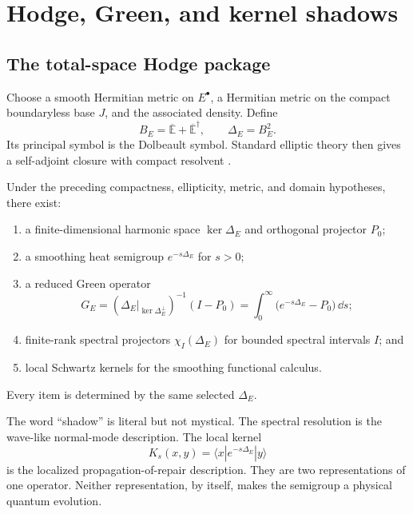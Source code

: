 \documentclass[11pt,a4paper]{article}
\newcommand{\Ebar}{\overline{\mathbb E}}
\begin{document}
\section{Hodge, Green, and kernel shadows}
\label{sec:hodge}

\subsection{The total-space Hodge package}

Choose a smooth Hermitian metric on \(E^\bullet\), a Hermitian metric on the
compact boundaryless base \(J\), and the associated density.  Define
\begin{equation}
B_E=\Ebar+\Ebar^{\dagger},
\qquad
\Delta_E=B_E^2.
\label{eq:super-hodge}
\end{equation}
Its principal symbol is the Dolbeault symbol.  Standard elliptic theory then
gives a self-adjoint closure with compact resolvent
\cite{BerlineGetzlerVergne2004}.

\begin{theorem}
\label{thm:hodge-kernel}
Under the preceding compactness, ellipticity, metric, and domain hypotheses,
there exist:
\begin{enumerate}
\item a finite-dimensional harmonic space \(\ker\Delta_E\) and orthogonal
projector \(P_0\);
\item a smoothing heat semigroup \(e^{-s\Delta_E}\) for \(s>0\);
\item a reduced Green operator
\begin{equation}
G_E=(\Delta_E|_{\ker\Delta_E^{\perp}})^{-1}(I-P_0)
=\int_0^\infty\bigl(e^{-s\Delta_E}-P_0\bigr)\,\dd s;
\label{eq:green-heat}
\end{equation}
\item finite-rank spectral projectors \(\chi_I(\Delta_E)\) for bounded
spectral intervals \(I\); and
\item local Schwartz kernels for the smoothing functional calculus.
\end{enumerate}
Every item is determined by the same selected \(\Delta_E\).
\end{theorem}

The word ``shadow'' is literal but not mystical.  The spectral resolution
is the wave-like normal-mode description.  The local kernel
\[
K_s(x,y)=\langle x|e^{-s\Delta_E}|y\rangle
\]
is the localized propagation-of-repair description.  They are two
representations of one operator.  Neither representation, by itself, makes
the semigroup a physical quantum evolution.
\end{document}
